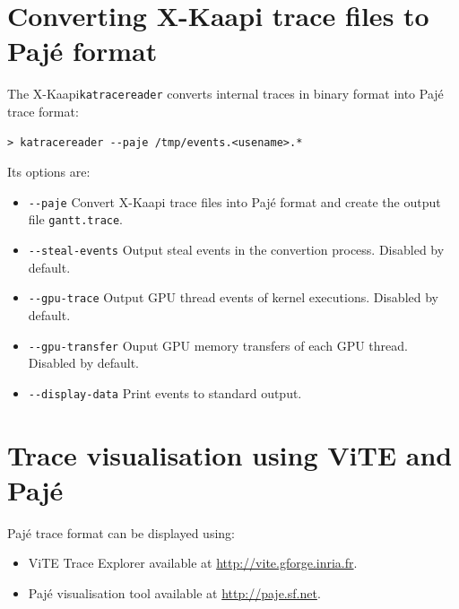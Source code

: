 \documentclass{article}[12pt]
\newcommand{\kaapi}{\textsc{X}-Kaapi\xspace}
\begin{document}
\section{Converting \kaapi trace files to Paj\'e format} \label{sec:convert}

The \kaapi \texttt{katracereader} converts internal traces in binary format
into Paj\'e trace format:
\begin{verbatim}
> katracereader --paje /tmp/events.<usename>.*
\end{verbatim}
Its options are:
\begin{itemize} %
\item \verb+--paje+\newline
Convert \kaapi trace files into Paj\'e format and create the output file \texttt{gantt.trace}.
\item \verb+--steal-events+\newline
Output steal events in the convertion process. Disabled by default.
\item \verb+--gpu-trace+\newline
Output GPU thread events of kernel executions. Disabled by default.
\item \verb+--gpu-transfer+\newline
Ouput GPU memory transfers of each GPU thread. Disabled by default.
\item \verb+--display-data+\newline
Print events to standard output.
\end{itemize} %

\section{Trace visualisation using ViTE and Paj\'e} \label{sec:visualisation}

Paj\'e trace format can be displayed using:
\begin{itemize}
\item ViTE Trace Explorer available at \url{http://vite.gforge.inria.fr}.
\item Paj\'e visualisation tool available at \url{http://paje.sf.net}.
\end{itemize}
\end{document}
